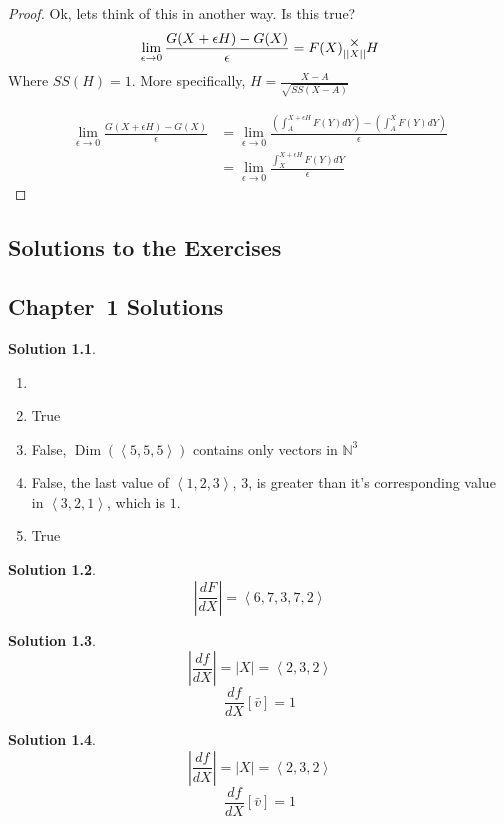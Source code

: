 \documentclass[12pt]{book}
\theoremstyle{plain}
\theoremstyle{definition}
\theoremstyle{ppart}
\theoremstyle{case}
\newcounter{solutionctr}
\theoremstyle{solution}
\newtheorem{solution}{Solution}
\newcommand{\solutionsection}[1]{
  \section{Chapter~#1 Solutions}\setcounter{solutionctr}{0}}
\DeclareMathOperator{\Dim}{Dim}
\newcommand{\mmult}[1]{\text{\raisebox{1ex}{$\underset{#1}{\times}$}}}
\newcommand{\shape}[1]{\left|#1\right|}
\begin{document}
\begin{landscape}
\begin{proof}
Ok, lets think of this in another way. Is this true?
\[
	\lim_{\epsilon \to 0}
	\frac{
		G(X+\epsilon H) - G(X)
	}{\epsilon}
	=
	F(X) \mmult{\shape{\shape{X}}} H
\]
Where $SS(H) = 1$. More specifically, $H = \frac{X-A}{\sqrt{SS(X-A)}}$

\begin{align*}
\lim_{\epsilon \to 0}
\frac{
	G(X+\epsilon H) - G(X)
}{\epsilon}
&= 
\lim_{\epsilon \to 0}
\frac{
	\left( \int_A^{X+\epsilon H} F(Y) dY \right) - \left( \int_A^X F(Y) dY \right)
}{\epsilon} \\
&= 
\lim_{\epsilon \to 0}
\frac{
	\int_X^{X+\epsilon H} F(Y) dY
}{\epsilon}
\end{align*}
\end{proof}
\end{landscape}

\begin{appendices}

\chapter{Solutions to the Exercises}

\solutionsection{1}

\begin{solution}
\begin{enumerate}
\item[]
\item True
\item False, $\Dim(\left<5,5,5\right>)$ contains only vectors in $\mathbb{N}^3$ 
\item False, the last value of $\left<1,2,3\right>$, $3$, is greater than it's
						 corresponding value in $\left<3,2,1\right>$, which is $1$.
\item True
\end{enumerate}
\end{solution}

\begin{solution}
\[ \shape{\frac{dF}{dX}} = \left<6,7,3,7,2\right> \]
\end{solution}

\begin{solution}
\[ \shape{\frac{df}{dX}} = \shape{X} = \left<2,3,2\right> \]
\[ \frac{df}{dX}[\bar{v}] = 1 \]
\end{solution}

\begin{solution}
\[ \shape{\frac{df}{dX}} = \shape{X} = \left<2,3,2\right> \]
\[ \frac{df}{dX}[\bar{v}] = 1 \]
\end{solution}


\end{appendices}
\end{document}
